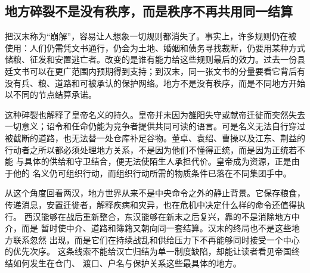 \subsection{地方碎裂不是没有秩序，而是秩序不再共用同一结算}

把汉末称为“崩解”，容易让人想象一切规则都消失了。事实上，许多规则仍在被
使用：人们仍需凭文书通行，仍会为土地、婚姻和债务寻找裁断，仍要用某种方式
储粮、征发和安置逃亡者。改变的是谁有能力给这些规则最后的效力。过去一份县
廷文书可以在更广范围内预期得到支持；到汉末，同一张文书的分量要看它背后有
没有兵、粮、道路和可被承认的保护网络。地方不是没有秩序，而是不同地方开始
以不同的节点结算承诺。

这种碎裂也解释了皇帝名义的持久。皇帝并未因为雒阳失守或献帝迁徙而突然失去
一切意义；诏令和任命仍能为竞争者提供共同可读的语言。可是名义无法自行穿过
被截断的道路，也无法替一处仓库补足谷物。董卓、袁绍、曹操以及江东、荆益的
行动者之所以都必须处理地方关系，不是因为他们不懂得正统，而是因为正统若不能
与具体的供给和守卫结合，便无法使陌生人承担代价。皇帝成为资源，正是由于他的
名义仍可组织行动，而组织行动所需的物质条件已落在不同集团手中。

从这个角度回看两汉，地方世界从来不是中央命令之外的静止背景。它保存粮食，
传递消息，安置迁徙者，解释疾病和灾异，也在危机中决定什么样的命令还值得执行。
西汉能够在战后重新整合，东汉能够在新末之后复兴，靠的不是消除地方中介，而是
暂时使中介、道路和簿籍又朝向同一套结算。汉末的终局也不是这些地方联系忽然
出现，而是它们在持续战乱和供给压力下不再能够同时接受一个中心的优先次序。
这条线索不能给汉亡归结为单一制度缺陷，却能让读者看见帝国终结如何发生在仓门、
渡口、户名与保护关系这些最具体的地方。
